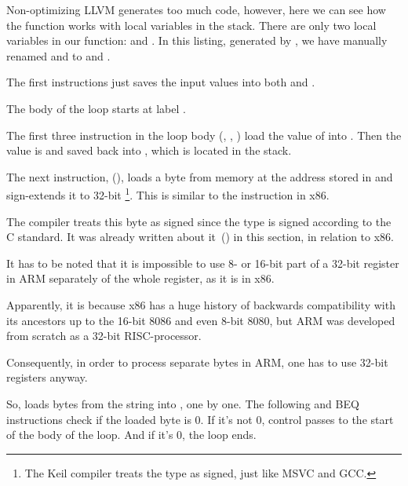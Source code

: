 ﻿

\mysubparagraph{\NonOptimizingXcodeIV (\ARMMode)}



Non-optimizing LLVM generates too much code, however, here we can see how the function works with 
local variables in the stack.
There are only two local variables in our function:  and .
In this listing, generated by \IDA, we have manually renamed  and  to  and .

The first instructions just saves the input values into both  and .

The body of the loop starts at label .

The first three instruction in the loop body (, \ADD, ) load the value of  into . 
Then the value is  and saved back into , which is located in the stack.

The next instruction,   (), loads a byte from memory at the address stored in  and sign-extends it to 32-bit
\footnote{The Keil compiler treats the \Tchar type as signed, just like MSVC and GCC.}.
This is similar to the \MOVSX instruction in x86.

The compiler treats this byte as signed since the \Tchar type is signed according to the C standard.
It was already written about it~() in this section, in relation to x86.


It has to be noted that it is impossible to use 8- or 16-bit part 
of a 32-bit register in ARM separately of the whole register,
as it is in x86.

Apparently, it is because x86 has a huge history of backwards compatibility with its ancestors 
up to the 16-bit 8086 and even 8-bit 8080,
but ARM was developed from scratch as a 32-bit RISC-processor.

Consequently, in order to process separate bytes in ARM, one has to use 32-bit registers anyway.

So,  loads bytes from the string into , one by one.
The following \CMP and \ac{BEQ} instructions check if the loaded byte is 0.
If it's not 0, control passes to the start of the body of the loop.
And if it's 0, the loop ends.

